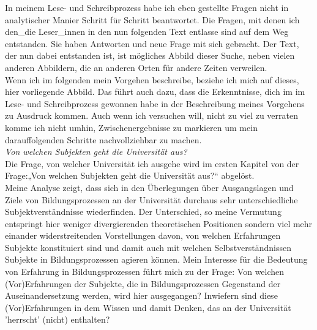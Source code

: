 \noindent In meinem Lese- und Schreibprozess habe ich eben gestellte Fragen nicht in
analytischer Manier Schritt für Schritt beantwortet. Die Fragen, mit denen ich
den\_die Leser\_innen in den nun folgenden Text entlasse sind auf dem Weg
entstanden. Sie haben Antworten und neue Frage mit sich gebracht. Der Text, der
nun dabei entstanden ist, ist mögliches Abbild dieser Suche, neben vielen
anderen Abbildern, die an anderen Orten für andere Zeiten verweilen.\\
Wenn ich im folgenden mein Vorgehen beschreibe, beziehe ich mich auf dieses,
hier vorliegende  Abbild. Das führt auch dazu, dass die Erkenntnisse, dich im
im Lese- und Schreibprozess gewonnen habe in der Beschreibung meines Vorgehens
zu Ausdruck kommen. Auch wenn ich versuchen will, nicht zu viel zu verraten
komme ich nicht umhin, Zwischenergebnisse zu markieren um mein darauffolgenden
Schritte nachvollziehbar zu machen.\\

\noindent\textit{Von welchen Subjekten geht die Universität aus?}\\
Die Frage, von
welcher Universität ich ausgehe wird im ersten Kapitel von der Frage:„Von
welchen Subjekten geht die Universität aus?“ abgelöst.\\
 Meine Analyse zeigt,
dass sich in den Überlegungen über Ausgangslagen und Ziele von
Bildungsprozessen an der Universität durchaus sehr unterschiedliche
Subjektverständnisse wiederfinden. Der Unterschied, so meine Vermutung
entspringt hier weniger divergierenden theoretischen Positionen sondern viel
mehr einander widerstreitenden Vorstellungen davon, von welchen Erfahrungen
Subjekte konstituiert sind und damit auch mit welchen Selbstverständnissen
Subjekte in Bildungsprozessen agieren können. Mein Interesse für die Bedeutung
von Erfahrung in Bildungsprozessen führt mich zu der Frage: Von welchen
(Vor)Erfahrungen der Subjekte, die in Bildungsprozessen Gegenstand der
Auseinandersetzung werden, wird hier ausgegangen? Inwiefern sind diese
(Vor)Erfahrungen in dem Wissen und damit Denken, das an der Universität
'herrscht' (nicht) enthalten?\\

